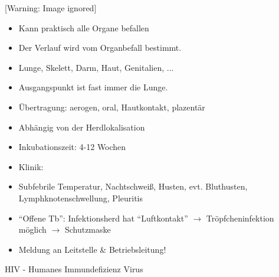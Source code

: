 \documentclass{article}
\begin{document}
\begin{center}
 [Warning: Image ignored] %

\end{center}
\begin{itemize}
\item Kann praktisch alle Organe befallen 

\item Der Verlauf wird vom Organbefall bestimmt.

\end{itemize}
\begin{itemize}
\item Lunge, Skelett, Darm, Haut, Genitalien, ...

\end{itemize}
\begin{itemize}
\item Ausgangspunkt ist fast immer die Lunge.

\item \"Ubertragung: aerogen, oral, Hautkontakt, plazent\"ar

\end{itemize}
\begin{itemize}
\item Abh\"angig von der Herdlokalisation

\end{itemize}
\begin{itemize}
\item Inkubationszeit: 4-12 Wochen

\item Klinik:

\end{itemize}
\begin{itemize}
\item Subfebrile Temperatur, Nachtschwei{\ss}, Husten, evt. Bluthusten,
Lymphknotenschwellung,  Pleuritis

\end{itemize}
\begin{itemize}
\item {\textquotedblleft}Offene Tb{\textquotedblright}:
Infektionsherd hat {\textquotedblleft}Luftkontakt{\textquotedblright}
${\rightarrow}$ Tr\"opfcheninfektion m\"oglich ${\rightarrow}$
Schutzmaske

\item Meldung an Leitstelle \& Betriebsleitung!

\end{itemize}
HIV - Humanes
Immundefizienz Virus
\end{document}
